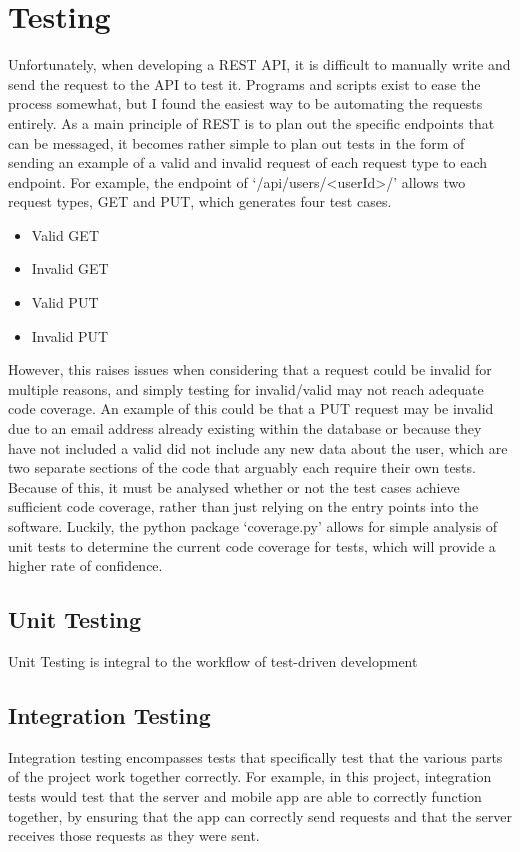 \section{Testing}
Unfortunately, when developing a REST API, it is difficult to manually write and send the request to the API to test it.
Programs and scripts exist to ease the process somewhat, but I found the easiest way to be automating the requests entirely. 
As a main principle of REST is to plan out the specific endpoints that can be messaged, it becomes rather simple to plan out tests in the form of sending an example of a valid and invalid request of each request type to each endpoint.
For example, the endpoint of `/api/users/<userId>/' allows two request types, GET and PUT, which generates four test cases.
\begin{itemize}
	\item{Valid GET}
	\item{Invalid GET}
	\item{Valid PUT}
	\item{Invalid PUT}
\end{itemize}  

However, this raises issues when considering that a request could be invalid for multiple reasons, and simply testing for invalid/valid may not reach adequate code coverage.
An example of this could be that a PUT request may be invalid due to an email address already existing within the database or because they have not included a valid did not include any new data about the user, which are two separate sections of the code that arguably each require their own tests.
Because of this, it must be analysed whether or not the test cases achieve sufficient code coverage, rather than just relying on the entry points into the software.
Luckily, the python package `coverage.py' allows for simple analysis of unit tests to determine the current code coverage for tests, which will provide a higher rate of confidence.

\subsection{Unit Testing} 
Unit Testing is integral to the workflow of test-driven development

\subsection{Integration Testing}
Integration testing encompasses tests that specifically test that the various parts of the project work together correctly.
For example, in this project, integration tests would test that the server and mobile app are able to correctly function together, by ensuring that the app can correctly send requests and that the server receives those requests as they were sent.


